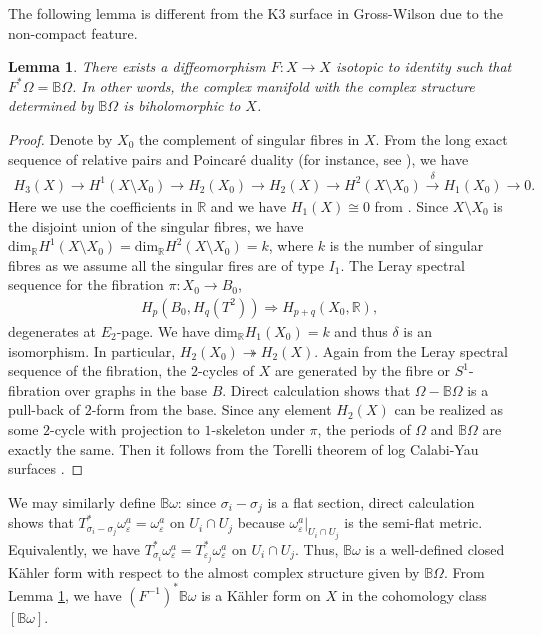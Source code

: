 \documentclass[11pt]{amsart}
\theoremstyle{plain}
\newtheorem{lem}[thm]{Lemma}
\theoremstyle{definition}
\numberwithin{equation}{section}
\renewcommand{\epsilon}{\varepsilon}
\begin{document}
The following lemma is different from the K3 surface in Gross-Wilson due to the non-compact feature. 
\begin{lem}\label{lem twist}
	There exists a diffeomorphism $F:X\rightarrow X$ isotopic to identity such that $F^*\Omega=\mathbb{B}\Omega$. In other words, the complex manifold with the complex structure determined by $\mathbb{B}\Omega$ is biholomorphic to $X$.
\end{lem}
\begin{proof}
	Denote by $X_0$ the complement of singular fibres in $X$. From the long exact sequence of relative pairs and Poincar\'e duality (for instance, see \cite[Section 7.12]{D}), we have 
	  \begin{align}
	  	H_3(X)\rightarrow H^1(X\setminus X_0) \rightarrow H_2(X_0)\rightarrow H_2(X)\rightarrow H^2(X\setminus X_0) \xrightarrow{\delta} H_1(X_0)\rightarrow 0.
	  \end{align} Here we use the coefficients in $\mathbb{R}$ and we have $H_1(X)\cong 0$ from \cite[Corollary 7.5]{SZ}. Since $X\setminus X_0$ is the disjoint union of the singular fibres, we have $\mbox{dim}_{\mathbb{R}}H^1(X\setminus X_0)=\mbox{dim}_{\mathbb{R}}H^2(X\setminus X_0)=k$, where $k$ is the number of singular fibres as we assume all the singular fires are of type $I_1$. The Leray spectral sequence for the fibration $\pi:X_0\rightarrow B_0$,
        \begin{align*}
        	  H_p(B_0, H_q(T^2))\Rightarrow H_{p+q}(X_0,\mathbb{R}),
        \end{align*} degenerates at $E_2$-page. We have $\mbox{dim}_{\mathbb{R}}H_1(X_0)=k$ and thus $\delta$ is an isomorphism. In particular,  $H_2(X_0)\twoheadrightarrow H_2(X)$. Again from the Leray spectral sequence of the fibration, the $2$-cycles of $X$ are generated by the fibre or $S^1$-fibration over graphs in the base $B$. 	
	Direct calculation shows that $\Omega-\mathbb{B}\Omega$ is a pull-back of $2$-form from the base. Since any element $H_2(X)$ can be realized as some $2$-cycle with projection to $1$-skeleton under $\pi$, the periods of $\Omega$ and $\mathbb{B}\Omega$ are exactly the same. 
	Then it follows from the Torelli theorem of log Calabi-Yau surfaces \cite{GHK}. 
\end{proof}


We may similarly define $\mathbb{B}\omega$:
since $\sigma_i-\sigma_j$ is a flat section, direct calculation shows that  $T_{\sigma_i-\sigma_j}^*\omega_{\epsilon}^a=\omega_{\epsilon}^a$ on $U_i\cap U_j$ because $\omega_{\epsilon}^a|_{U_i\cap U_j}$ is the semi-flat metric. Equivalently, we have $T^*_{\sigma_i}\omega_{\epsilon}^a=T^*_{\epsilon_j}\omega_{\epsilon}^a$ on $U_i\cap U_j$. Thus, $\mathbb{B}\omega$ is a well-defined closed K\"ahler form with respect to the almost complex structure given by $\mathbb{B}\Omega$. From Lemma \ref{lem twist}, we have $(F^{-1})^*\mathbb{B}\omega$ is a K\"ahler form on $X$ in the cohomology class $[\mathbb{B}\omega]$. 
\end{document}
